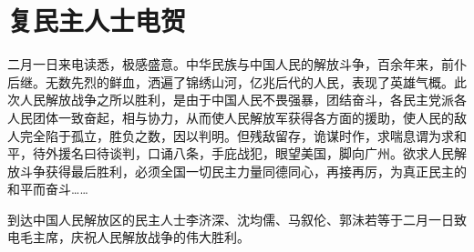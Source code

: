 \section[复民主人士电贺（一九四九年二月二日）]{复民主人士电贺}


二月一日来电读悉，极感盛意。中华民族与中国人民的解放斗争，百余年来，前仆后继。无数先烈的鲜血，洒遍了锦绣山河，亿兆后代的人民，表现了英雄气概。此次人民解放战争之所以胜利，是由于中国人民不畏强暴，团结奋斗，各民主党派各人民团体一致奋起，相与协力，从而使人民解放军获得各方面的援助，使人民的敌人完全陷于孤立，胜负之数，因以判明。但残敌留存，诡谋时作，求喘息谓为求和平，待外援名曰待谈判，口诵八条，手庇战犯，眼望美国，脚向广州。欲求人民解放斗争获得最后胜利，必须全国一切民主力量同德同心，再接再厉，为真正民主的和平而奋斗……

到达中国人民解放区的民主人士李济深、沈均儒、马叙伦、郭沬若等于二月一日致电毛主席，庆祝人民解放战争的伟大胜利。

